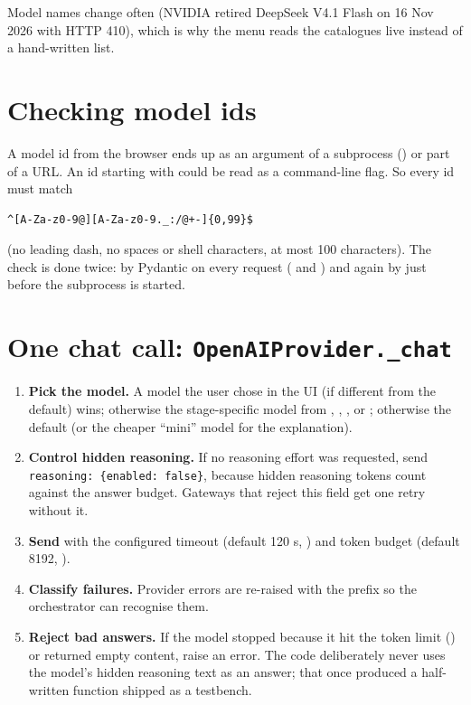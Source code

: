 Model names change often (NVIDIA retired DeepSeek V4.1 Flash on 16 Nov 2026 with HTTP 410), which is why the menu reads the catalogues live instead of a hand-written list.

\section{Checking model ids}
\label{sec:modelid}

A model id from the browser ends up as an argument of a subprocess () or part of a URL. An id starting with \code{-} could be read as a command-line flag. So every id must match
\begin{lstlisting}[style=plain]
^[A-Za-z0-9@][A-Za-z0-9._:/@+-]{0,99}$
\end{lstlisting}
(no leading dash, no spaces or shell characters, at most 100 characters). The check is done twice: by Pydantic on every request ( and ) and again by  just before the subprocess is started.

\section{One chat call: \texttt{OpenAIProvider.\_chat}}

\begin{enumerate}
  \item \textbf{Pick the model.} A model the user chose in the UI (if different from the default) wins; otherwise the stage-specific model from , , ,  or ; otherwise the default (or the cheaper ``mini'' model for the explanation).
  \item \textbf{Control hidden reasoning.} If no reasoning effort was requested, send \texttt{reasoning: \{enabled: false\}}, because hidden reasoning tokens count against the answer budget. Gateways that reject this field get one retry without it.
  \item \textbf{Send} with the configured timeout (default 120 s, ) and token budget (default 8192, ).
  \item \textbf{Classify failures.} Provider errors are re-raised with the prefix  so the orchestrator can recognise them.
  \item \textbf{Reject bad answers.} If the model stopped because it hit the token limit () or returned empty content, raise an error. The code deliberately never uses the model's hidden reasoning text as an answer; that once produced a half-written function shipped as a testbench.
\end{enumerate}

